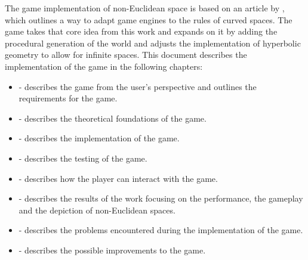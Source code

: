 The game implementation of non-Euclidean space is based on an article by \citeauthor{Szirmay-Kalos2022} \cite{Szirmay-Kalos2022}, which outlines a way to adapt game engines to the rules of curved spaces.
The game takes that core idea from this work and expands on it by adding the procedural generation of the world and adjusts the implementation of hyperbolic geometry to allow for infinite spaces.
This document describes the implementation of the game in the following chapters:
\begin{itemize}
    \item {} - describes the game from the user's perspective and outlines the requirements for the game.
    \item {} - describes the theoretical foundations of the game.
    \item {} - describes the implementation of the game.
    \item {} - describes the testing of the game.
    \item {} - describes how the player can interact with the game.
    \item {} - describes the results of the work focusing on the performance, the gameplay and the depiction of non-Euclidean spaces.
    \item {} - describes the problems encountered during the implementation of the game.
    \item {} - describes the possible improvements to the game.
\end{itemize}


